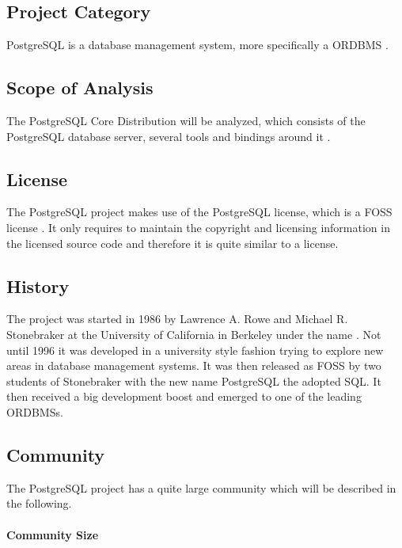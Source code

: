 \subsection{Project Category}

PostgreSQL is a database management system, more specifically a \ac{ORDBMS}
\cite{PostgreSQLAbout}.

\subsection{Scope of Analysis}

The PostgreSQL Core Distribution will be analyzed, which consists of the
PostgreSQL database server, several tools and bindings around it
\cite{PostgreSQLDownload}.

\subsection{License}

The PostgreSQL project makes use of the PostgreSQL license, which is a
\ac{FOSS} license \cite{PostgreSQLFAQ,PostgreSQLLicense}. It only requires to
maintain the copyright and licensing information in the licensed source code
and therefore it is quite similar to a  license.

\subsection{History}

The project was started in 1986 by Lawrence A. Rowe and Michael R. Stonebraker
at the University of California in Berkeley under the name
 \cite{PostgreSQLHistory}. Not until 1996 it was
developed in a university style fashion trying to explore new areas in database
management systems. It was then released as \ac{FOSS} by two students of
Stonebraker with the new name PostgreSQL the adopted \ac{SQL}. It then received
a big development boost and emerged to one of the leading \acp{ORDBMS}.

\subsection{Community}

The PostgreSQL project has a quite large community which will be described in
the following.

\paragraph{Community Size}

